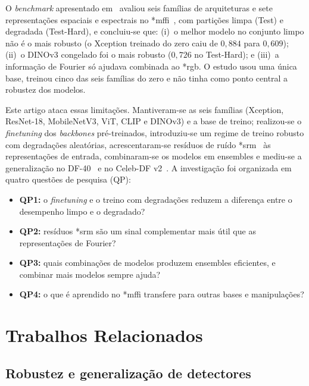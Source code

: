 \documentclass[10pt,conference]{IEEEtran}
\makeatletter
\newcommand{\acr@use}[2]{%
  \@ifundefined{acr@short@#1}{\textbf{??#1??}}{%
    \@ifundefined{acr@used@#1}{%
      \ifnum#2=0 \csname acr@long@#1\endcsname\else\csname acr@longpl@#1\endcsname\fi
      ~(\csname acr@short@#1\endcsname\ifnum#2=1 s\fi)%
      \expandafter\gdef\csname acr@used@#1\endcsname{}%
    }{%
      \csname acr@short@#1\endcsname\ifnum#2=1 s\fi
    }}%
}
\DeclareRobustCommand{\gls}{\@ifstar{\acr@use@s}{\acr@use@s}}
\newcommand{\acr@use@s}[1]{\acr@use{#1}{0}}
\makeatother
\begin{document}
O \textit{benchmark} apresentado em~\cite{cunha2026benchmarking} avaliou seis famílias de arquiteturas e sete representações espaciais e espectrais no \gls*{mffi}~\cite{ref_mffi}, com partições limpa (Test) e degradada (Test-Hard), e concluiu-se que:
(i)~o melhor modelo no conjunto limpo não é o mais robusto (o Xception treinado do zero caiu de $0{,}884$ para $0{,}609$);
(ii)~o DINOv3 congelado foi o mais robusto ($0{,}726$ no Test-Hard); e
(iii)~a informação de Fourier só ajudava combinada ao \gls*{rgb}.
O estudo usou uma única base, treinou cinco das seis famílias do zero e não tinha como ponto central a robustez dos modelos.

Este artigo ataca essas limitações.
Mantiveram-se as seis famílias (Xception, ResNet-18, MobileNetV3, ViT, CLIP e DINOv3) e a base de treino; realizou-se o \textit{finetuning} dos \textit{backbones} pré-treinados, introduziu-se um regime de treino robusto com degradações aleatórias, acrescentaram-se resíduos de ruído \gls*{srm}~\cite{fridrich2012rich} às representações de entrada, combinaram-se os modelos em ensembles e mediu-se a generalização no DF-40~\cite{yan2024df40} e no Celeb-DF v2~\cite{li2020celeb}.
A investigação foi organizada em quatro questões de pesquisa (QP):
\begin{itemize}
    \item \textbf{QP1:} o \textit{finetuning} e o treino com degradações reduzem a diferença entre o desempenho limpo e o degradado?
    \item \textbf{QP2:} resíduos \gls*{srm} são um sinal complementar mais útil que as representações de Fourier?
    \item \textbf{QP3:} quais combinações de modelos produzem ensembles eficientes, e combinar mais modelos sempre ajuda?
    \item \textbf{QP4:} o que é aprendido no \gls*{mffi} transfere para outras bases e manipulações?
\end{itemize}

\section{Trabalhos Relacionados}
\label{sec:related}

\subsection{Robustez e generalização de detectores}
\end{document}
